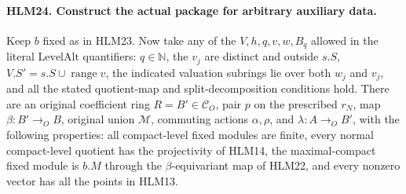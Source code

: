 \documentclass[11pt,a4paper]{article}
\numberwithin{equation}{section}
\theoremstyle{remark}\newtheorem{remark}[theorem]{Remark}
\begin{document}
\paragraph{HLM24. Construct the actual package for arbitrary auxiliary data.}
\label{claim:HLM24}
Keep \(b\) fixed as in HLM23.  Now take any of the
\(V,h,q,v,w,B_q\) allowed in the literal
\(\mathrm{LevelAlt}\) quantifiers: \(q\in\mathbb N\),
the \(v_j\) are distinct and outside \(s.S\),
\(V.S'=s.S\cup\operatorname{range}v\), the indicated
valuation subrings lie over both \(w_j\) and \(v_j\),
and all the stated quotient-map and split-decomposition
conditions hold.  There are an original coefficient ring
\(R=B'\in\mathcal C_O\), pair \(p\) on the prescribed
\(r_N\), map \(\beta:B'\to_OB\), original union
\(\mathcal M\), commuting actions \(\alpha,\rho\),
and \(\lambda:A\to_OB'\), with the following properties:
all compact-level fixed modules are finite, every normal
compact-level quotient has the projectivity of HLM14,
the maximal-compact fixed module is \(b.M\) through the
\(\beta\)-equivariant map of HLM22, and every nonzero
vector has all the points in HLM13.
\end{document}
